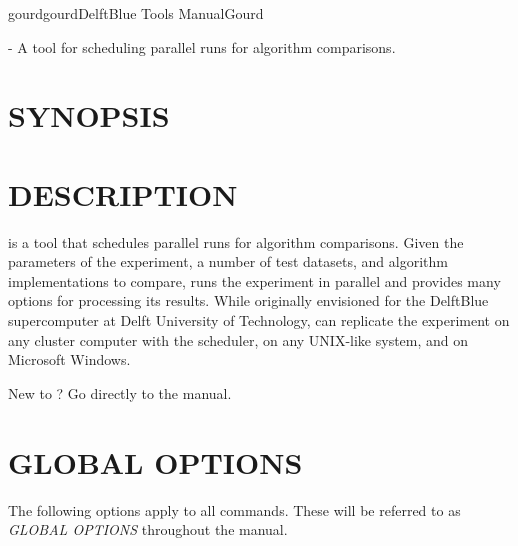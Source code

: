 \documentclass[a4paper,english]{article}
\begin{document}
    \pagestyle{fancy}


    \begin{Name}{1}{gourd}{gourd}{DelftBlue Tools Manual}{Gourd}
\begin{adjustwidth}{18pt}{0pt}

         - A tool for scheduling parallel runs for algorithm comparisons.

\end{adjustwidth}
    \end{Name}


\begin{adjustwidth}{18pt}{0pt}
    \section{SYNOPSIS}

         

    \section{DESCRIPTION}

         is a tool that schedules parallel runs for algorithm comparisons.
        Given the parameters of the experiment, a number of test datasets, and algorithm implementations to compare,
         runs the experiment in parallel and provides many options for processing its results.
        While originally envisioned for the DelftBlue supercomputer at Delft University of Technology,
         can replicate the experiment on any cluster computer with the  scheduler,
        on any UNIX-like system, and on Microsoft Windows.

        New to ? Go directly to the  manual.


    \section{GLOBAL OPTIONS}

        The following options apply to all  commands.
        These will be referred to as \emph{GLOBAL OPTIONS} throughout the manual.


\end{adjustwidth}
\end{document}
